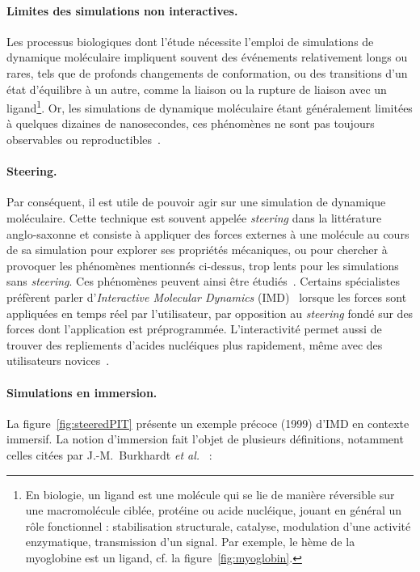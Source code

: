 	\paragraph{Limites des simulations non interactives.}
	Les processus biologiques dont l'étude nécessite l'emploi de simulations de dynamique moléculaire impliquent souvent des événements relativement longs ou rares, tels que de profonds changements de conformation, ou des transitions d'un état d'équilibre à un autre, comme la liaison ou la rupture de liaison avec un ligand\footnote{En biologie, un ligand est une molécule qui se lie de manière réversible sur une macromolécule ciblée, protéine ou acide nucléique, jouant en général un rôle fonctionnel : stabilisation structurale, catalyse, modulation d'une activité enzymatique, transmission d'un signal. Par exemple, le hème de la myoglobine est un ligand, cf. la figure~\ref{fig:myoglobin}.}. Or, les simulations de dynamique moléculaire étant généralement limitées à quelques dizaines de nanosecondes, ces phénomènes ne sont pas toujours observables ou reproductibles~\cite{phillips2005scalable}.
	
	\paragraph{Steering.}
	Par conséquent, il est utile de pouvoir agir sur une simulation de dynamique moléculaire. Cette technique est souvent appelée \emph{steering} dans la littérature anglo-saxonne et consiste à appliquer des forces externes à une molécule au cours de sa simulation pour explorer ses propriétés mécaniques, ou pour chercher à provoquer les phénomènes mentionnés ci-dessus, trop lents pour les simulations sans \emph{steering}. Ces phénomènes peuvent ainsi être étudiés~\cite{izrailev1999steered, isralewitz2001steered, isralewitz2001steered}. Certains spécialistes~\cite{phillips2005scalable} préfèrent parler d'\emph{Interactive Molecular Dynamics} (IMD)~\cite{stone2001system, grayson2003mechanisms} lorsque les forces sont appliquées en temps réel par l'utilisateur, par opposition au \emph{steering} fondé sur des forces dont l'application est préprogrammée. L'interactivité permet aussi de trouver des repliements d'acides nucléiques plus rapidement, même avec des utilisateurs novices~\cite{mazzanti2017can}.
	
	\paragraph{Simulations en immersion.}
	La figure~\ref{fig:steeredPIT} présente un exemple précoce (1999) d'IMD en contexte immersif. La notion d'immersion fait l'objet de plusieurs définitions, notamment celles citées par J.-M.~Burkhardt \emph{et al.}~\cite{burkhardt2003immersion} :
	

